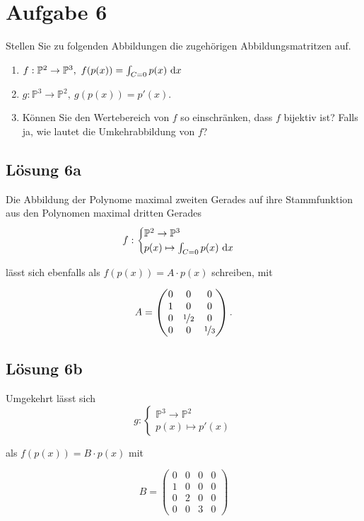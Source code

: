 \documentclass[main.tex]{subfiles}
\begin{document}
\section{Aufgabe 6}
Stellen Sie zu folgenden Abbildungen die zugehörigen Abbildungsmatritzen auf.

\begin{enumerate}
    \item $f: \mathbb{P}^2 \to \mathbb{P}^3, \ f(p(x)) = \int_{C=0} p(x) \dx$
    \item $g: \mathbb{P}^3 \to \mathbb{P}^2, \ g(p(x)) = p'(x).$
    \item Können Sie den Wertebereich von $f$ so einschränken, dass $f$ bijektiv ist? Falls ja, wie lautet die Umkehrabbildung von $f$?
\end{enumerate}

\subsection{Lösung 6a}
Die Abbildung der Polynome maximal zweiten Gerades auf ihre Stammfunktion aus den Polynomen maximal dritten Gerades
$$
    f : \begin{cases}
        \mathbb{P}^2 \to \mathbb{P}^3\\
        p(x) \mapsto \int_{C=0} p(x) ~\mathrm{d}x
    \end{cases}
$$

lässt sich ebenfalls als $f(p(x)) = A\cdot p(x)$ schreiben, mit

$$
    A = \begin{pmatrix}
        0 & 0 & 0 \\
        1 & 0 & 0 \\
        0 & \nicefrac{1}{2} & 0 \\
        0 & 0 & \nicefrac{1}{3}
    \end{pmatrix}.
$$

\subsection{Lösung 6b}
Umgekehrt lässt sich
$$
    g : \begin{cases}
        \mathbb{P}^3 \to \mathbb{P}^2\\
        p(x) \mapsto p'(x)
    \end{cases}
$$

als $f(p(x)) = B\cdot p(x)$ mit

$$
    B = \begin{pmatrix}
        0 & 0 & 0 & 0 \\
        1 & 0 & 0 & 0 \\
        0 & 2 & 0 & 0 \\
        0 & 0 & 3 & 0
    \end{pmatrix}
$$
\end{document}
